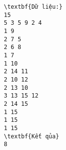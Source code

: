 \begin{verbatim}
\textbf{Dữ liệu:} 
15
5 3 5 9 2 4
1 9
2 7 5
2 6 8
1 7
1 10
2 14 11
2 10 12
2 13 10
3 13 15 12
2 14 15
1 15
1 15
1 15
\textbf{Kết qủa} 
8 
\end{verbatim}